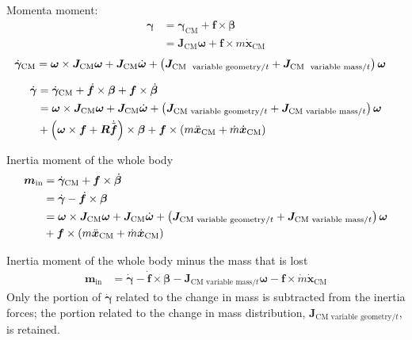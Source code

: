 \documentclass[10pt,dvips,fleqn,subeqn]{report}
\newcommand{\T}[1]{\bm{#1}}
\newcommand{\TT}[1]{\bm{#1}}
\begin{document}
Momenta moment:
\begin{align}
	\T{\gamma}
	&=
	\T{\gamma}_\text{CM}
	+
	\T{f} \times \T{\beta}
	\nonumber \\
	&=
	\TT{J}_\text{CM} \T{\omega}
	+
	\T{f} \times m \dot{\T{x}}_\text{CM}
\end{align}
\begin{align}
	\dot{\T{\gamma}}_\text{CM}
	&=
	\T{\omega} \times \TT{J}_\text{CM} \T{\omega}
	+
	\TT{J}_\text{CM} \dot{\T{\omega}}
	+
	\plbr{
		\TT{J}_{\text{CM \ variable geometry}/t}
		+
		\TT{J}_{\text{CM \ variable mass}/t}
	} \T{\omega}
\end{align}

\begin{align}
	\dot{\T{\gamma}}
	&=
	\dot{\T{\gamma}}_\text{CM}
	+
	\dot{\T{f}} \times \T{\beta}
	+
	\T{f} \times \dot{\T{\beta}}
	\nonumber \\
	&=
	\T{\omega} \times \TT{J}_\text{CM} \T{\omega}
	+
	\TT{J}_\text{CM} \dot{\T{\omega}}
	+
	\plbr{
		\TT{J}_{\text{CM variable geometry}/t}
		+
		\TT{J}_{\text{CM variable mass}/t}
	} \T{\omega}
	\nonumber \\
	&\mbox{}
	+ \plbr{
		\T{\omega} \times \T{f}
		+
		\TT{R} \dot{\tilde{\T{f}}}
	} \times \T{\beta}
	+
	\T{f} \times \plbr{
		m \ddot{\T{x}}_\text{CM}
		+
		\dot{m} \dot{\T{x}}_\text{CM}
	}
\end{align}

Inertia moment of the whole body
\begin{align}
	\T{m}_\text{in}
	&=
	\dot{\T{\gamma}}_\text{CM}
	+
	\T{f} \times \dot{\T{\beta}}
	\nonumber \\
	&=
	\dot{\T{\gamma}}
	-
	\dot{\T{f}} \times \T{\beta}
	\nonumber \\
	&=
	\T{\omega} \times \TT{J}_\text{CM} \T{\omega}
	+
	\TT{J}_\text{CM} \dot{\T{\omega}}
	+
	\plbr{
		\TT{J}_{\text{CM variable geometry}/t}
		+
		\TT{J}_{\text{CM variable mass}/t}
	} \T{\omega}
	\nonumber \\
	&\mbox{}
	+
	\T{f} \times \plbr{
		m \ddot{\T{x}}_\text{CM}
		+
		\dot{m} \dot{\T{x}}_\text{CM}
	}
\end{align}

Inertia moment of the whole body minus the mass that is lost
\begin{align}
	\T{m}_\text{in}
	&=
	\dot{\T{\gamma}}
	-
	\dot{\T{f}} \times \T{\beta}
	-
	\TT{J}_{\text{CM variable mass}/t} \T{\omega}
	-
	\T{f} \times \dot{m} \dot{\T{x}}_\text{CM}
\end{align}
Only the portion of $\dot{\T{\gamma}}$ related to the change in mass
is subtracted from the inertia forces; the portion related
to the change in mass distribution,
$\TT{J}_{\text{CM variable geometry}/t}$,
is retained.
\end{document}
